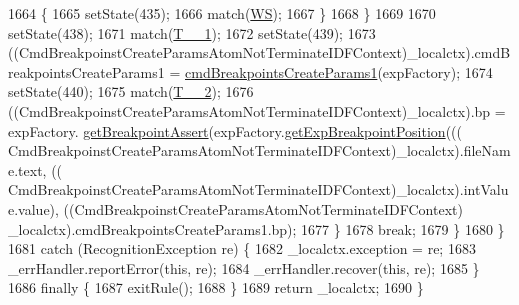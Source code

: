 \begin{DoxyCode}
1664           \{
1665           setState(435);
1666           match(\hyperlink{classgov_1_1nasa_1_1jpf_1_1inspector_1_1server_1_1expression_1_1parser_1_1_expression_grammar_parser_ace44714ae633c7b14794cc5a24d9ebf3}{WS});
1667           \}
1668         \}
1669 
1670         setState(438);
1671         match(\hyperlink{classgov_1_1nasa_1_1jpf_1_1inspector_1_1server_1_1expression_1_1parser_1_1_expression_grammar_parser_aa7abaea5c810058ee748969dff385b9e}{T\_\_1});
1672         setState(439);
1673         ((CmdBreakpoinstCreateParamsAtomNotTerminateIDFContext)\_localctx).cmdBreakpointsCreateParams1 = 
      \hyperlink{classgov_1_1nasa_1_1jpf_1_1inspector_1_1server_1_1expression_1_1parser_1_1_expression_grammar_parser_aa16584e37b631f4c0cdd1b148deda9df}{cmdBreakpointsCreateParams1}(expFactory);
1674         setState(440);
1675         match(\hyperlink{classgov_1_1nasa_1_1jpf_1_1inspector_1_1server_1_1expression_1_1parser_1_1_expression_grammar_parser_afad4c6ad364a1969b2f65bf00345f6bf}{T\_\_2});
1676          ((CmdBreakpoinstCreateParamsAtomNotTerminateIDFContext)\_localctx).bp =  expFactory.
      \hyperlink{classgov_1_1nasa_1_1jpf_1_1inspector_1_1server_1_1expression_1_1_expression_factory_a2400863e60747a98d6598cd773fba50a}{getBreakpointAssert}(expFactory.\hyperlink{classgov_1_1nasa_1_1jpf_1_1inspector_1_1server_1_1expression_1_1_expression_factory_a631b1ba3019f72cc97a19376f47ecfb5}{getExpBreakpointPosition}(((
      CmdBreakpoinstCreateParamsAtomNotTerminateIDFContext)\_localctx).fileName.text, ((
      CmdBreakpoinstCreateParamsAtomNotTerminateIDFContext)\_localctx).intValue.value), ((CmdBreakpoinstCreateParamsAtomNotTerminateIDFContext)
      \_localctx).cmdBreakpointsCreateParams1.bp); 
1677         \}
1678         \textcolor{keywordflow}{break};
1679       \}
1680     \}
1681     \textcolor{keywordflow}{catch} (RecognitionException re) \{
1682       \_localctx.exception = re;
1683       \_errHandler.reportError(\textcolor{keyword}{this}, re);
1684       \_errHandler.recover(\textcolor{keyword}{this}, re);
1685     \}
1686     \textcolor{keywordflow}{finally} \{
1687       exitRule();
1688     \}
1689     \textcolor{keywordflow}{return} \_localctx;
1690   \}
\end{DoxyCode}
